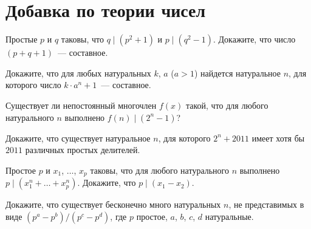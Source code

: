 

\section*{Добавка по теории чисел}


\begin{problems}

\item
Простые $p$ и $q$ таковы, что $q \mid (p^2 + 1)$ и $p \mid (q^2 - 1)$.
Докажите, что число $(p + q + 1)$~--- составное.

\item
Докажите, что для любых натуральных $k$, $a$ ($a > 1$) найдется натуральное $n$, для
которого число $k \cdot a^n + 1$~--- составное.

\item
Существует ли непостоянный многочлен $f(x)$ такой, что для любого натурального $n$
выполнено $f(n) \mid (2^n - 1)$?

\item
Докажите, что существует натуральное $n$, для которого $2^n + 2011$ имеет хотя бы
$2011$ различных простых делителей.

\item
Простое $p$ и $x_1$, $\ldots$, $x_p$ таковы, что для любого натурального $n$
выполнено $p \mid (x_1^n + \ldots + x_p^n)$.
Докажите, что $p \mid (x_1 - x_2)$.

\item
Докажите, что существует бесконечно много натуральных $n$, не представимых в виде
$(p^a - p^b) / (p^c - p^d)$,
где $p$ простое, $a$, $b$, $c$, $d$ натуральные.

\end{problems}

